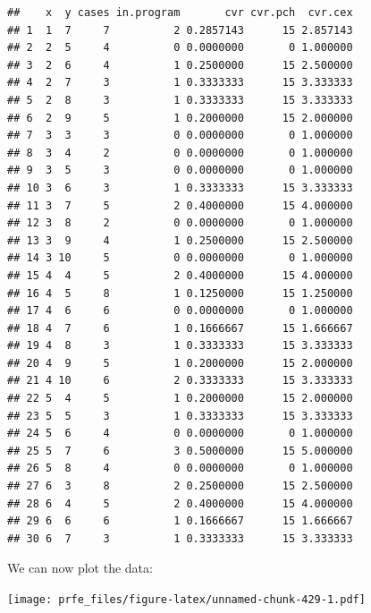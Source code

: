 \documentclass[12pt,a4paper]{book}
\newenvironment{Shaded}{\begin{snugshade}}{\end{snugshade}}
\newcommand{\KeywordTok}[1]{\textcolor[rgb]{0.13,0.29,0.53}{\textbf{#1}}}
\newcommand{\DataTypeTok}[1]{\textcolor[rgb]{0.13,0.29,0.53}{#1}}
\newcommand{\StringTok}[1]{\textcolor[rgb]{0.31,0.60,0.02}{#1}}
\newcommand{\OperatorTok}[1]{\textcolor[rgb]{0.81,0.36,0.00}{\textbf{#1}}}
\newcommand{\NormalTok}[1]{#1}
\theoremstyle{definition}
\theoremstyle{definition}
\theoremstyle{definition}
\theoremstyle{remark}
\begin{document}
\begin{verbatim}
##    x  y cases in.program       cvr cvr.pch  cvr.cex
## 1  1  7     7          2 0.2857143      15 2.857143
## 2  2  5     4          0 0.0000000       0 1.000000
## 3  2  6     4          1 0.2500000      15 2.500000
## 4  2  7     3          1 0.3333333      15 3.333333
## 5  2  8     3          1 0.3333333      15 3.333333
## 6  2  9     5          1 0.2000000      15 2.000000
## 7  3  3     3          0 0.0000000       0 1.000000
## 8  3  4     2          0 0.0000000       0 1.000000
## 9  3  5     3          0 0.0000000       0 1.000000
## 10 3  6     3          1 0.3333333      15 3.333333
## 11 3  7     5          2 0.4000000      15 4.000000
## 12 3  8     2          0 0.0000000       0 1.000000
## 13 3  9     4          1 0.2500000      15 2.500000
## 14 3 10     5          0 0.0000000       0 1.000000
## 15 4  4     5          2 0.4000000      15 4.000000
## 16 4  5     8          1 0.1250000      15 1.250000
## 17 4  6     6          0 0.0000000       0 1.000000
## 18 4  7     6          1 0.1666667      15 1.666667
## 19 4  8     3          1 0.3333333      15 3.333333
## 20 4  9     5          1 0.2000000      15 2.000000
## 21 4 10     6          2 0.3333333      15 3.333333
## 22 5  4     5          1 0.2000000      15 2.000000
## 23 5  5     3          1 0.3333333      15 3.333333
## 24 5  6     4          0 0.0000000       0 1.000000
## 25 5  7     6          3 0.5000000      15 5.000000
## 26 5  8     4          0 0.0000000       0 1.000000
## 27 6  3     8          2 0.2500000      15 2.500000
## 28 6  4     5          2 0.4000000      15 4.000000
## 29 6  6     6          1 0.1666667      15 1.666667
## 30 6  7     3          1 0.3333333      15 3.333333
\end{verbatim}

We can now plot the data:

\begin{Shaded}
\end{Shaded}

\texttt{[image: prfe\_files/figure-latex/unnamed-chunk-429-1.pdf]}
\end{document}
